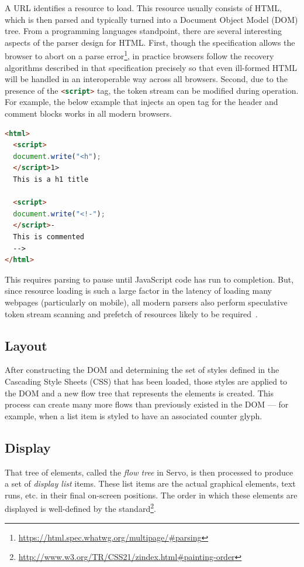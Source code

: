 A URL identifies a resource to load.
This resource usually consists of HTML, which is then parsed and typically turned into a Document Object
Model (DOM) tree.
From a programming languages standpoint, there are several interesting aspects of the parser design
for HTML.
First, though the specification allows the browser to abort on a parse error\footnote{\url{https://html.spec.whatwg.org/multipage/#parsing}},
in practice browsers follow the recovery algorithms described in that specification precisely so that
even ill-formed HTML will be handled in an interoperable way across all browsers.
Second, due to the presence of the \lstinline[language=HTML]{<script>} tag, the token stream can be modified
during operation.
For example, the below example that injects an open tag for the header and comment blocks works in all modern browsers.
\begin{lstlisting}[language=HTML]
<html>
  <script>
  document.write("<h");
  </script>1>
  This is a h1 title

  <script>
  document.write("<!-");
  </script>-
  This is commented
  -->
</html>
\end{lstlisting}
This requires parsing to pause until JavaScript code has run to completion.
But, since resource loading is such a large factor in the latency of loading many webpages (particularly on mobile),
all modern parsers also perform speculative token stream scanning and prefetch of resources likely to be required~\cite{browsers-slow-smartphones}.

\subsection{Layout}

After constructing the DOM and determining the set of styles defined in the Cascading Style Sheets (CSS) that has
been loaded, those styles are applied to the DOM and a new flow tree that represents the elements is created.
This process can create many more flows than previously existed in the DOM --- for example, when a list item is
styled to have an associated counter glyph.

\subsection{Display}

That tree of elements, called the \emph{flow tree} in Servo, is then processed to produce a set of \emph{display list} items.
These list items are the actual graphical elements, text runs, etc. in their final on-screen positions.
The order in which these elements are displayed is well-defined by the standard\footnote{\url{http://www.w3.org/TR/CSS21/zindex.html#painting-order}}.

